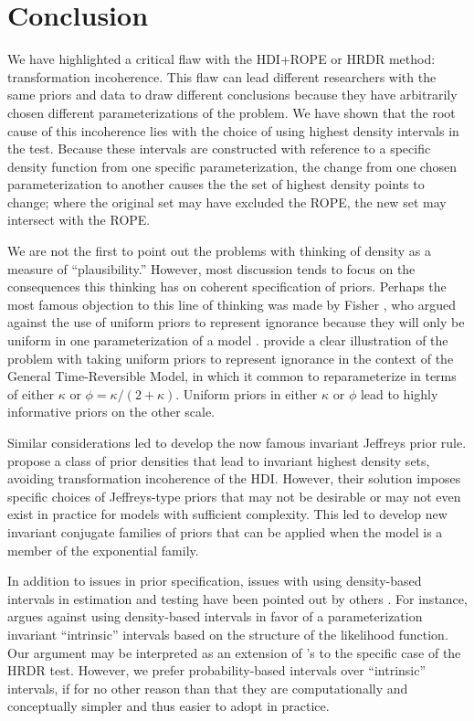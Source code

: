 \documentclass[9pt,twocolumn,twoside]{cidlab-draft}\templatetype{cidlab-invited}
\newcommand{\hdr}{HRDR}
\begin{document}
\section*{Conclusion}
We have highlighted a critical flaw with the HDI+ROPE or \hdr{} method: transformation incoherence. This flaw can lead different researchers with the same priors and data to draw different conclusions because they have arbitrarily chosen different parameterizations of the problem. We have shown that the root cause of this incoherence lies with the choice of using highest density intervals in the test. Because these intervals are constructed with reference to a specific density function from one specific parameterization, the change from one chosen parameterization to another causes the the set of highest density points to change; where the original set may have excluded the ROPE, the new set may intersect with the ROPE. 

We are not the first to point out the problems with thinking of density as a measure of ``plausibility.'' However, most discussion tends to focus on the consequences this thinking has on coherent specification of priors. Perhaps the most famous objection to this line of thinking was made by Fisher \cite{lehmann2011fisher}, who argued against the use of uniform priors to represent ignorance because they will only be uniform in one parameterization of a model \cite<for a thorough demonstration see>{ly2017tutorial}.  provide a clear illustration of the problem with taking uniform priors to represent ignorance in the context of the General Time-Reversible Model, in which it common to reparameterize in terms of either $\kappa$ or $\phi = \kappa/(2+\kappa)$. Uniform priors in either $\kappa$ or $\phi$ lead to highly informative priors on the other scale. 

Similar considerations led  to develop the now famous invariant Jeffreys prior rule.  propose a class of prior densities that lead to invariant highest density sets, avoiding transformation incoherence of the HDI. However, their solution imposes specific choices of Jeffreys-type priors that may not be desirable or may not even exist in practice for models with sufficient complexity. This led  to develop new invariant conjugate families of priors that can be applied when the model is a member of the exponential family. 

In addition to issues in prior specification, issues with using density-based intervals in estimation and testing have been pointed out by others  \cite{bernardo2005,garcia2006,robert1996intrinsic,shalloway2014}. For instance, \citeauthor{bernardo2005} argues against using density-based intervals in favor of a parameterization invariant ``intrinsic'' intervals based on the structure of the likelihood function. Our argument may be interpreted as an extension of \citeauthor{bernardo2005}'s to the specific case of the \hdr{} test. However, we prefer probability-based intervals over ``intrinsic'' intervals, if for no other reason than that they are computationally and conceptually simpler and thus easier to adopt in practice. 
\end{document}

